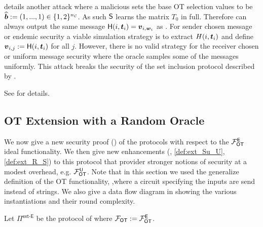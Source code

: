  details another attack where a malicious \send sets the base OT selection values to be $\widehat\bb:=(1,...,1)\in \{1,2\}^\nc$. As such $\send$ learns the matrix $T_0$ in full. Therefore \send can always output the same message $\H(i, \tt_i)=\vv_{i,\ww_i}$ as \rec. For sender chosen message or endemic security a viable simulation strategy is to extract $H(i, \tt_i)$ and define $\vv_{i,j}:=\H(i, \tt_i)$ for all $j$. However, there is no valid strategy for the receiver chosen or uniform message security where the oracle samples some of the messages uniformly. This attack breaks the security of the set inclusion protocol described by \cite[Figure 5]{RSA:OrrOrsSch17}.
\iffullversion

\else
See  for details.
\fi





\subsection{OT Extension with a Random Oracle}\label{sec:extSec}

We now give a new security proof () of the \cite{C:KelOrsSch15,RSA:OrrOrsSch17} protocols with respect to the $\OOT^\E$ ideal functionality. We then give new enhancements (, \ref{def:ext_Su_U}, \ref{def:ext_R_S}) to this protocol that provider stronger notions of security at a modest overhead, e.g. $\OOT^\U$. Note that in this section we used the generalize definition of the OT functionality, \iffullversion{},\fi where a circuit specifying the inputs are send instead of strings. We also give a data flow diagram in  showing the various instantiations and their round complexity.


\begin{definition}\label{def:ext_E_E}
	Let $\Pi^{\textsf{ext-E}}$ be the protocol of  where $\OOT:=\OOT^\E$.
\end{definition}



